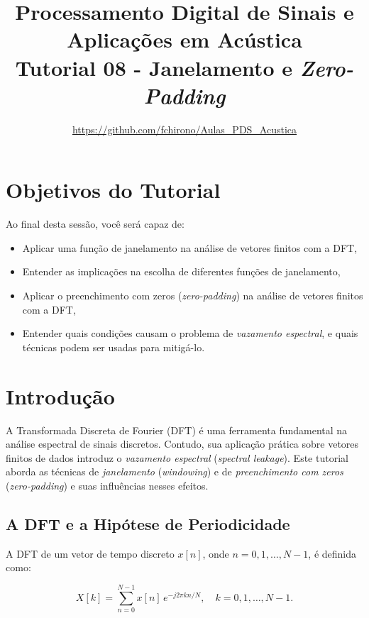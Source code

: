 \documentclass[a4paper,twoside,12pt]{article}
\title{\vspace{-2cm} Processamento Digital de Sinais e Aplicações em Acústica\\ Tutorial 08 - Janelamento e \emph{Zero-Padding}}
\author{\url{https://github.com/fchirono/Aulas_PDS_Acustica}}
\begin{document}
	\date{}
	\maketitle
	
	\section*{Objetivos do Tutorial}
	Ao final desta sessão, você será capaz de:
	\begin{itemize}
		\item Aplicar uma função de janelamento na análise de vetores finitos com a DFT,
		\item Entender as implicações na escolha de diferentes funções de janelamento,
		\item Aplicar o preenchimento com zeros (\emph{zero-padding}) na análise de vetores finitos com a DFT,
		\item Entender quais condições causam o problema de \emph{vazamento espectral}, e quais técnicas podem ser usadas para mitigá-lo.
	\end{itemize}
	
	\begingroup
	\let\clearpage\relax
	\tableofcontents
	\endgroup
	
	
	\section{Introdução}
	
	A Transformada Discreta de Fourier (DFT) é uma ferramenta fundamental na análise espectral de sinais discretos. Contudo, sua aplicação prática sobre vetores finitos de dados introduz o \emph{vazamento espectral} (\textit{spectral leakage}). Este tutorial aborda as técnicas de \emph{janelamento} (\emph{windowing}) e de \emph{preenchimento com zeros} (\textit{zero-padding}) e suas influências nesses efeitos.
	
	\subsection{A DFT e a Hipótese de Periodicidade}
	
	A DFT de um vetor de tempo discreto $x[n]$, onde $n = 0, 1, \ldots, N-1$, é definida como:
	
	\begin{equation}
		X[k] = \sum_{n=0}^{N-1} x[n]\, e^{-j2\pi kn/N}, \quad k = 0, 1, \ldots, N-1.
		\label{eq:dft}
	\end{equation}
	
\end{document}
